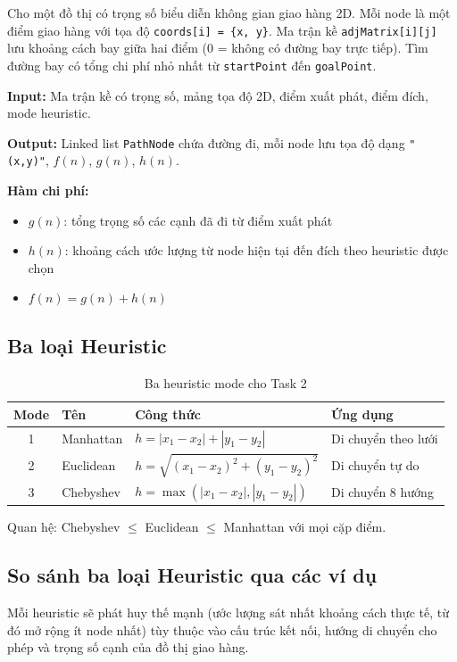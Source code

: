 \documentclass[13pt,a4paper]{article}
\begin{document}
Cho một đồ thị có trọng số biểu diễn không gian giao hàng 2D. Mỗi node là một điểm giao hàng với tọa độ \texttt{coords[i] = \{x, y\}}. Ma trận kề \texttt{adjMatrix[i][j]} lưu khoảng cách bay giữa hai điểm (0 = không có đường bay trực tiếp). Tìm đường bay có tổng chi phí nhỏ nhất từ \texttt{startPoint} đến \texttt{goalPoint}.

\textbf{Input:} Ma trận kề có trọng số, mảng tọa độ 2D, điểm xuất phát, điểm đích, mode heuristic.

\textbf{Output:} Linked list \texttt{PathNode} chứa đường đi, mỗi node lưu tọa độ dạng \texttt{"(x,y)"}, $f(n)$, $g(n)$, $h(n)$.

\textbf{Hàm chi phí:}
\begin{itemize}
    \item $g(n)$: tổng trọng số các cạnh đã đi từ điểm xuất phát
    \item $h(n)$: khoảng cách ước lượng từ node hiện tại đến đích theo heuristic được chọn
    \item $f(n) = g(n) + h(n)$
\end{itemize}


\subsection{Ba loại Heuristic}

\begin{table}[H]
\centering
\begin{tabular}{clll}
\toprule
\textbf{Mode} & \textbf{Tên} & \textbf{Công thức} & \textbf{Ứng dụng} \\
\midrule
1 & Manhattan  & $h = |x_1-x_2| + |y_1-y_2|$ & Di chuyển theo lưới \\
2 & Euclidean  & $h = \sqrt{(x_1-x_2)^2+(y_1-y_2)^2}$ & Di chuyển tự do \\
3 & Chebyshev  & $h = \max(|x_1-x_2|,|y_1-y_2|)$ & Di chuyển 8 hướng \\
\bottomrule
\end{tabular}
\caption{Ba heuristic mode cho Task 2}
\end{table}

Quan hệ: Chebyshev $\leq$ Euclidean $\leq$ Manhattan với mọi cặp điểm.

\subsection{So sánh ba loại Heuristic qua các ví dụ}

Mỗi heuristic sẽ phát huy thế mạnh (ước lượng sát nhất khoảng cách thực tế, từ đó mở rộng ít node nhất) tùy thuộc vào cấu trúc kết nối, hướng di chuyển cho phép và trọng số cạnh của đồ thị giao hàng.
\end{document}
